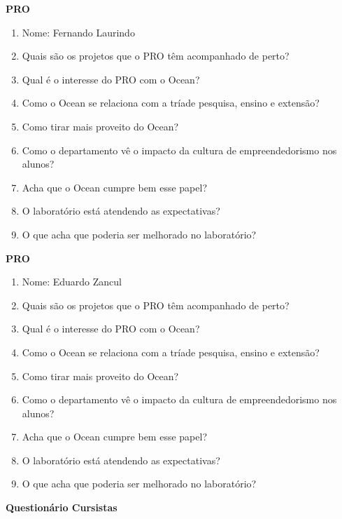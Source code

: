 \begin{anexosenv}
\clearpage

\textbf{PRO}

\begin{enumerate}
\item Nome: Fernando Laurindo
\item Quais são os projetos que o PRO têm acompanhado de perto?
\item Qual é o interesse do PRO com o Ocean?
\item Como o Ocean se relaciona com a tríade pesquisa, ensino e extensão?
\item Como tirar mais proveito do Ocean?
\item Como o departamento vê o impacto da cultura de empreendedorismo nos alunos?
\item Acha que o Ocean cumpre bem esse papel?
\item O laboratório está atendendo as expectativas?
\item O que acha que poderia ser melhorado no laboratório?
\end{enumerate}

\clearpage

\textbf{PRO}

\begin{enumerate}
\item Nome: Eduardo Zancul
\item Quais são os projetos que o PRO têm acompanhado de perto?
\item Qual é o interesse do PRO com o Ocean?
\item Como o Ocean se relaciona com a tríade pesquisa, ensino e extensão?
\item Como tirar mais proveito do Ocean?
\item Como o departamento vê o impacto da cultura de empreendedorismo nos alunos?
\item Acha que o Ocean cumpre bem esse papel?
\item O laboratório está atendendo as expectativas?
\item O que acha que poderia ser melhorado no laboratório?
\end{enumerate}

\clearpage

\textbf{Questionário Cursistas}


\end{anexosenv}
